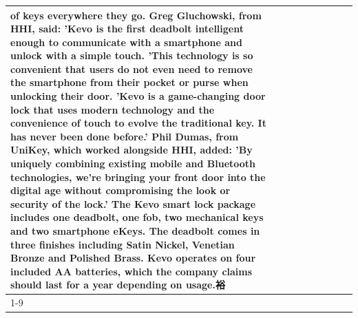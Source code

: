 \begin{table}[H]
\begin{tabular}{lllrlllll}
of keys everywhere they go. Greg Gluchowski, from HHI, said: 'Kevo is the first deadbolt intelligent enough to communicate with a smartphone and unlock with a simple touch. 'This technology is so convenient that users do not even need to remove the smartphone from their pocket or purse when unlocking their door. 'Kevo is a game-changing door lock that uses modern technology and the convenience of touch to evolve the traditional key. It has never been done before.' Phil Dumas, from UniKey, which worked alongside HHI, added: 'By uniquely combining existing mobile and Bluetooth technologies, we’re bringing your front door into the digital age without compromising the look or security of the lock.' The Kevo smart lock package includes one deadbolt, one fob, two mechanical keys and two smartphone eKeys. The deadbolt comes in three finishes including Satin Nickel, Venetian Bronze and Polished Brass. Kevo operates on four included AA batteries, which the company claims should last for a year depending on usage.裕 \\
\cline{1-9}

\end{tabular}
\end{table}
